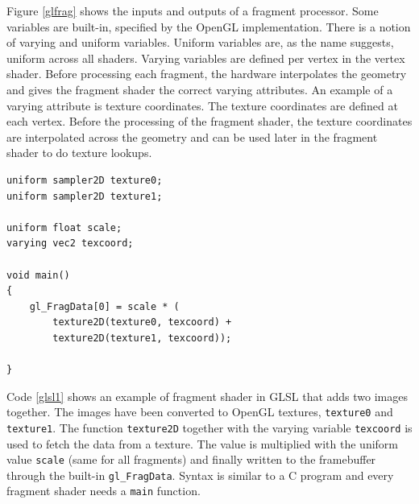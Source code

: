 Figure \ref{glfrag} shows the inputs and outputs of a fragment processor. Some variables are built-in, specified by the OpenGL implementation. There is a notion of varying and uniform variables. Uniform variables are, as the name suggests, uniform across all shaders. Varying variables are defined per vertex in the vertex shader. Before processing each fragment, the hardware interpolates the geometry and gives the fragment shader the correct varying attributes. An example of a varying attribute is texture coordinates. The texture coordinates are defined at each vertex. Before the processing of the fragment shader, the texture coordinates are interpolated across the geometry and can be used later in the fragment shader to do texture lookups.

\renewcommand{\lstlistingname}{Code}
\begin{lstlisting}[caption= Example of adding two images in GLSL, label=glsl1]
uniform sampler2D texture0;
uniform sampler2D texture1;

uniform float scale;
varying vec2 texcoord;

void main()
{
    gl_FragData[0] = scale * (
        texture2D(texture0, texcoord) + 
        texture2D(texture1, texcoord));

}
\end{lstlisting}

Code \ref{glsl1} shows an example of fragment shader in GLSL that adds two images together. The images have been converted to OpenGL textures, \texttt{texture0} and \texttt{texture1}. The function \texttt{texture2D} together with the varying variable \texttt{texcoord} is used to fetch the data from a texture. The value is multiplied with the uniform value \texttt{scale} (same for all fragments) and finally written to the framebuffer through the built-in \texttt{gl\_FragData}. Syntax is similar to a C program and every fragment shader needs a \texttt{main} function.
